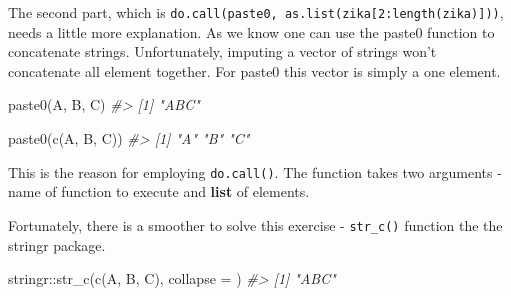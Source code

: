 \documentclass[
]{book}
\newenvironment{Shaded}{\begin{snugshade}}{\end{snugshade}}
\newcommand{\AttributeTok}[1]{\textcolor[rgb]{0.77,0.63,0.00}{#1}}
\newcommand{\CommentTok}[1]{\textcolor[rgb]{0.56,0.35,0.01}{\textit{#1}}}
\newcommand{\DecValTok}[1]{\textcolor[rgb]{0.00,0.00,0.81}{#1}}
\newcommand{\FunctionTok}[1]{\textcolor[rgb]{0.00,0.00,0.00}{#1}}
\newcommand{\NormalTok}[1]{#1}
\newcommand{\SpecialCharTok}[1]{\textcolor[rgb]{0.00,0.00,0.00}{#1}}
\newcommand{\StringTok}[1]{\textcolor[rgb]{0.31,0.60,0.02}{#1}}
\begin{document}
The second part, which is \texttt{do.call(paste0,\ as.list(zika{[}2:length(zika){]}))}, needs a little more explanation. As we know one can use the paste0 function to concatenate strings. Unfortunately, imputing a vector of strings won't concatenate all element together. For paste0 this vector is simply a one element.

\begin{Shaded}
\begin{Highlighting}[]
\FunctionTok{paste0}\NormalTok{(}\StringTok{\textquotesingle{}A\textquotesingle{}}\NormalTok{, }\StringTok{\textquotesingle{}B\textquotesingle{}}\NormalTok{, }\StringTok{\textquotesingle{}C\textquotesingle{}}\NormalTok{)}
\CommentTok{\#\textgreater{} [1] "ABC"}

\FunctionTok{paste0}\NormalTok{(}\FunctionTok{c}\NormalTok{(}\StringTok{\textquotesingle{}A\textquotesingle{}}\NormalTok{, }\StringTok{\textquotesingle{}B\textquotesingle{}}\NormalTok{, }\StringTok{\textquotesingle{}C\textquotesingle{}}\NormalTok{))}
\CommentTok{\#\textgreater{} [1] "A" "B" "C"}
\end{Highlighting}
\end{Shaded}

This is the reason for employing \texttt{do.call()}. The function takes two arguments - name of function to execute and \textbf{list} of elements.

Fortunately, there is a smoother to solve this exercise - \texttt{str\_c()} function the the stringr package.

\begin{Shaded}
\begin{Highlighting}[]
\NormalTok{stringr}\SpecialCharTok{::}\FunctionTok{str\_c}\NormalTok{(}\FunctionTok{c}\NormalTok{(}\StringTok{\textquotesingle{}A\textquotesingle{}}\NormalTok{, }\StringTok{\textquotesingle{}B\textquotesingle{}}\NormalTok{, }\StringTok{\textquotesingle{}C\textquotesingle{}}\NormalTok{), }\AttributeTok{collapse =} \StringTok{\textquotesingle{}\textquotesingle{}}\NormalTok{)}
\CommentTok{\#\textgreater{} [1] "ABC"}
\end{Highlighting}
\end{Shaded}

\begin{Shaded}
\end{Shaded}
\end{document}
